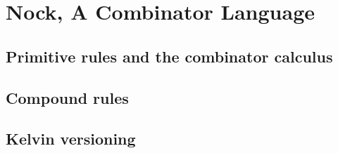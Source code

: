 \setchapterpreamble[u]{\margintoc}
\chapter{Nock, A Combinator Language}


\section{Primitive rules and the combinator calculus}

\section{Compound rules}

\section{Kelvin versioning}
